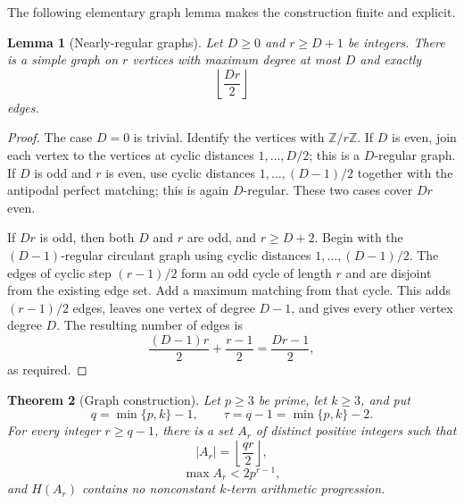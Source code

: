 \documentclass[10pt,a4paper]{amsart}
\numberwithin{equation}{section}
\newtheorem{theorem}{Theorem}[section]
\newtheorem{lemma}[theorem]{Lemma}
\newcommand{\Z}{\mathbb{Z}}
\newcommand{\floor}[1]{\left\lfloor #1\right\rfloor}
\begin{document}
\smallskip
\noindent
The following elementary graph lemma makes the construction finite and explicit.

\begin{lemma}[Nearly-regular graphs]\label{lem:nearly-regular-graph}
Let $D\ge0$ and $r\ge D+1$ be integers. There is a simple graph on $r$ vertices with maximum degree at most $D$ and exactly
\begin{equation}\label{eq:graph-edge-count}
\floor{\frac{Dr}{2}}
\end{equation}
edges.
\end{lemma}

\begin{proof}
The case $D=0$ is trivial. Identify the vertices with $\Z/r\Z$. If $D$ is even, join each vertex to the vertices at cyclic distances $1,\ldots,D/2$; this is a $D$-regular graph. If $D$ is odd and $r$ is even, use cyclic distances $1,\ldots,(D-1)/2$ together with the antipodal perfect matching; this is again $D$-regular. These two cases cover $Dr$ even.

\bigskip
\noindent
If $Dr$ is odd, then both $D$ and $r$ are odd, and $r\ge D+2$. Begin with the $(D-1)$-regular circulant graph using cyclic distances $1,\ldots,(D-1)/2$. The edges of cyclic step $(r-1)/2$ form an odd cycle of length $r$ and are disjoint from the existing edge set. Add a maximum matching from that cycle. This adds $(r-1)/2$ edges, leaves one vertex of degree $D-1$, and gives every other vertex degree $D$. The resulting number of edges is
\[
\frac{(D-1)r}{2}+\frac{r-1}{2}=\frac{Dr-1}{2},
\]
as required.
\end{proof}


\begin{theorem}[Graph construction]\label{thm:graph-construction}
Let $p\ge3$ be prime, let $k\ge3$, and put
\begin{equation}\label{eq:digit-capacity}
q=\min\{p,k\}-1,
\qquad
\tau=q-1=\min\{p,k\}-2.
\end{equation}
For every integer $r\ge q-1$, there is a set $A_r$ of distinct positive integers such that
\begin{equation}\label{eq:graph-size}
|A_r|=\floor{\frac{qr}{2}},
\end{equation}
\begin{equation}\label{eq:graph-height}
\max A_r<2p^{r-1},
\end{equation}
and $H(A_r)$ contains no nonconstant $k$-term arithmetic progression.
\end{theorem}
\end{document}
